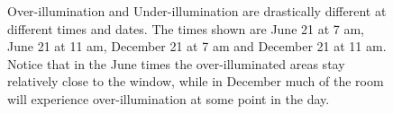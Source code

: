 \documentclass[10pt,twocolumn,letterpaper]{article}
\begin{document}
\begin{figure}[t]
%
\caption{Over-illumination and Under-illumination are drastically
  different at different times and dates.  The times shown are June 21
  at 7 am, June 21 at 11 am, December 21 at 7 am and December 21 at 11
  am.  Notice that in the June times the over-illuminated areas stay
  relatively close to the window, while in December much of the room
  will experience over-illumination at some point in the day.  }
\vspace{-0.15in}
\label{FIGURE:mrc331}
\end{figure}
\end{document}
